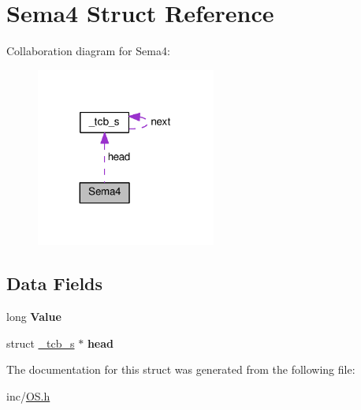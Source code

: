 \hypertarget{structSema4}{}\section{Sema4 Struct Reference}
\label{structSema4}


Collaboration diagram for Sema4\+:\nopagebreak
\begin{figure}[H]
\begin{center}
\leavevmode
\includegraphics[width=167pt]{structSema4__coll__graph}
\end{center}
\end{figure}
\subsection*{Data Fields}
\begin{DoxyCompactItemize}
\item 
long {\bfseries Value}\hypertarget{structSema4_a98b1e5b4f3a76692bb37db553c22e8b0}{}\label{structSema4_a98b1e5b4f3a76692bb37db553c22e8b0}

\item 
struct \hyperlink{struct__tcb__s}{\+\_\+tcb\+\_\+s} $\ast$ {\bfseries head}\hypertarget{structSema4_a03d774cbfedb9d522f31ded4c10d5668}{}\label{structSema4_a03d774cbfedb9d522f31ded4c10d5668}

\end{DoxyCompactItemize}


The documentation for this struct was generated from the following file\+:\begin{DoxyCompactItemize}
\item 
inc/\hyperlink{OS_8h}{O\+S.\+h}\end{DoxyCompactItemize}
